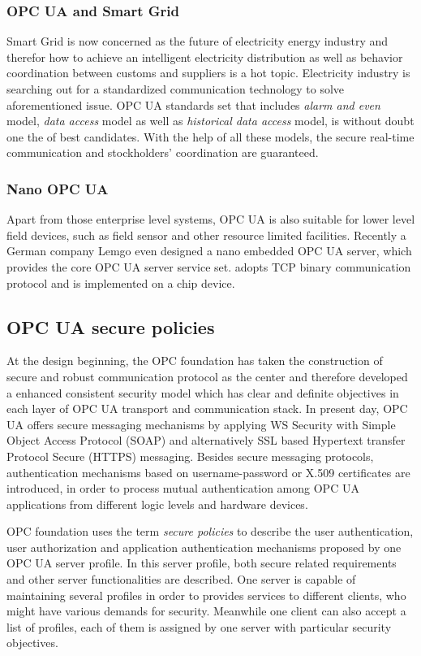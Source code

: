 \subsubsection{OPC UA and  Smart Grid}
Smart Grid is now concerned as the future of electricity energy industry and therefor how to achieve an intelligent electricity distribution as well as behavior coordination between customs and suppliers is a hot topic\cite{opc_grid}. Electricity industry is searching out for a standardized communication technology to solve aforementioned issue.
OPC UA standards set that includes \emph{alarm and even} model, \emph{data access} model as well as  \emph{historical data access} model, is without doubt one the of best candidates. With the help of all these models, the secure real-time communication and stockholders' coordination are guaranteed.

\subsubsection{Nano OPC UA }
Apart from those enterprise level systems, OPC UA is also suitable for lower level field devices, such as field sensor and other resource limited facilities. Recently a German company Lemgo even designed a nano embedded OPC UA server\cite{opc_lemgo}, which provides the core OPC UA server service set. adopts TCP binary communication protocol and is implemented on a chip device.

\subsection{OPC UA secure policies}
At the design beginning, the OPC foundation has taken the construction of secure and robust communication protocol as the center and therefore developed a enhanced consistent security model which has clear and definite objectives in each layer of OPC UA transport and communication stack. In present day, OPC UA  offers secure messaging mechanisms by applying WS Security with Simple Object Access Protocol (SOAP)  and alternatively SSL based Hypertext transfer Protocol Secure (HTTPS) messaging\cite{opc_secure_1}. Besides secure messaging protocols,  authentication mechanisms based on username-password or X.509 certificates are introduced, in order to process mutual authentication among OPC UA applications from different logic levels and hardware devices.

OPC foundation uses the term \emph{secure policies}\cite{O2} to describe the 
user authentication, user authorization and application authentication mechanisms proposed by one OPC UA server profile. In this server profile, both secure related requirements and other server functionalities are described. One server is capable of maintaining several profiles in order to provides services to different clients, who might have various demands for security. Meanwhile one client can also accept a list of profiles, each of them is assigned by one server with particular security objectives. 

